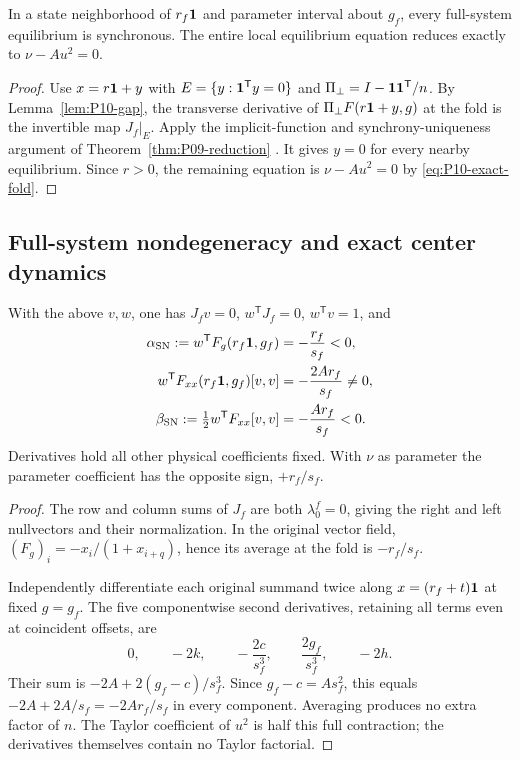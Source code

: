 \begin{proposition}
\label{prop:P10-reduction}
In a state neighborhood of $r_f\mathbf{1}$ and parameter interval about
$g_f$, every full-system equilibrium is synchronous. The entire local
equilibrium equation reduces exactly to $\nu-Au^2=0$.
\end{proposition}
\begin{proof}
Use $x=r\mathbf{1}+y$ with $E=\{y:\mathbf{1}^{\mathsf T}y=0\}$ and
$\Pi_\perp=I-\mathbf{1}\mathbf{1}^{\mathsf T}/n$. By Lemma~\ref{lem:P10-gap},
the transverse derivative of $\Pi_\perp F(r\mathbf{1}+y,g)$ at the fold
is the invertible map $J_f|_E$. Apply the implicit-function and
synchrony-uniqueness argument of Theorem~\ref{thm:P09-reduction}
\cite[Ch.~1]{GuckenheimerHolmes1983}. It gives $y=0$ for every
nearby equilibrium. Since $r>0$, the remaining equation is
$\nu-Au^2=0$ by \eqref{eq:P10-exact-fold}.
\end{proof}

\subsection{Full-system nondegeneracy and exact center dynamics}

\begin{proposition}
\label{prop:P10-coefficients}
With the above $v,w$, one has $J_fv=0$, $w^{\mathsf T}J_f=0$,
$w^{\mathsf T}v=1$, and
\begin{align}
 \alpha_{\rm SN}:=w^{\mathsf T}F_g(r_f\mathbf{1},g_f)
 &=-\frac{r_f}{s_f}<0,\label{eq:P10-alpha}\\
 w^{\mathsf T}F_{xx}(r_f\mathbf{1},g_f)[v,v]
 &=-\frac{2Ar_f}{s_f}\ne0,\label{eq:P10-contraction}\\
 \beta_{\rm SN}:=\tfrac12w^{\mathsf T}F_{xx}[v,v]
 &=-\frac{Ar_f}{s_f}<0.\label{eq:P10-beta}
\end{align}
Derivatives hold all other physical coefficients fixed. With $\nu$
as parameter the parameter coefficient has the opposite sign,
$+r_f/s_f$.
\end{proposition}
\begin{proof}
The row and column sums of $J_f$ are both $\lambda_0^f=0$, giving
the right and left nullvectors and their normalization. In the original
vector field, $(F_g)_i=-x_i/(1+x_{i+q})$, hence its average at the
fold is $-r_f/s_f$.

Independently differentiate each original summand twice along
$x=(r_f+t)\mathbf{1}$ at fixed $g=g_f$. The five componentwise second
derivatives, retaining all terms even at coincident offsets, are
\[
 0,\qquad -2k,\qquad -\frac{2c}{s_f^3},\qquad
 \frac{2g_f}{s_f^3},\qquad -2h.
\]
Their sum is $-2A+2(g_f-c)/s_f^3$. Since $g_f-c=A s_f^2$,
this equals $-2A+2A/s_f=-2Ar_f/s_f$ in every component.
Averaging produces no extra factor of $n$. The Taylor coefficient
of $u^2$ is half this full contraction; the derivatives themselves
contain no Taylor factorial.
\end{proof}


